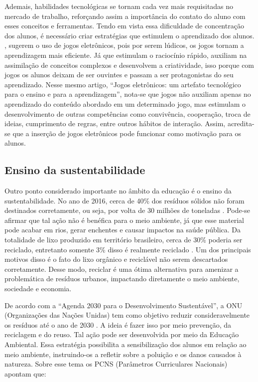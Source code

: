 Ademais, habilidades tecnológicas se tornam cada vez mais requisitadas no mercado de trabalho, reforçando assim a importância do contato do aluno com esses conceitos e ferramentas. Tendo em vista essa dificuldade de concentração dos alunos, é necessário criar estratégias que estimulem o aprendizado dos alunos. , sugerem o uso de jogos eletrônicos, pois por serem lúdicos, os jogos tornam a aprendizagem mais eficiente. Já que estimulam o raciocínio rápido, auxiliam na assimilação de conceitos complexos e desenvolvem a criatividade, isso porque com jogos os alunos deixam de ser ouvintes e passam a ser protagonistas do seu aprendizado. Nesse mesmo artigo, “Jogos eletrônicos: um artefato tecnológico para o ensino e para a aprendizagem”, nota-se que jogos não auxiliam apenas no aprendizado do conteúdo abordado em um determinado jogo, mas estimulam o desenvolvimento de outras competências como convivência, cooperação, troca de ideias, cumprimento de regras, entre outros hábitos de interação. Assim, acredita-se que a inserção de jogos eletrônicos pode funcionar como motivação para os alunos.

\subsection{Ensino da sustentabilidade}

Outro ponto considerado importante no âmbito da educação é o ensino da sustentabilidade. No ano de 2016, cerca de 40\% dos resíduos sólidos não foram destinados corretamente, ou seja, por volta de 30 milhões de toneladas \cite{abrelpe_2017}. Pode-se afirmar que tal ação não é benéfica para o meio ambiente, já que esse material pode acabar em rios, gerar enchentes e causar impactos na saúde pública. Da totalidade de lixo produzido em território brasileiro, cerca de 30\% poderia ser reciclado, entretanto somente 3\% disso é realmente reciclado \cite{pnrs_2010}. Um dos principais motivos disso é o fato do lixo orgânico e reciclável não serem descartados corretamente. Desse modo, reciclar é uma ótima alternativa para amenizar a problemática de resíduos urbanos, impactando diretamente o meio ambiente, sociedade e economia.

De acordo com a “Agenda 2030 para o Desenvolvimento Sustentável”, a ONU (Organizações das Nações Unidas) tem como objetivo reduzir consideravelmente os resíduos até o ano de 2030 \cite{onu30_2015}. A ideia é fazer isso por meio prevenção, da reciclagem e do reuso. Tal ação pode ser desenvolvida por meio da Educação Ambiental. Essa estratégia possibilita a sensibilização dos alunos em relação ao meio ambiente, instruindo-os a refletir sobre a poluição e os danos causados à natureza. Sobre esse tema os PCNS (Parâmetros
Curriculares Nacionais) apontam que:

